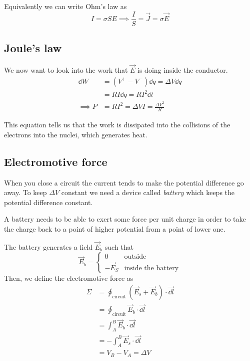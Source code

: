 \documentclass[12pt]{extarticle}
\begin{document}
Equivalently we can write Ohm's law as
\begin{equation}
    I = \sigma S E \implies \frac{I}{S} = \vec J = \sigma \vec E
\end{equation}

\subsection{Joule's law}

We now want to look into the work that $\vec E$ is doing inside the conductor.
\begin{align}
    \dd W      & = (V^+ - V^-) \dd q = \Delta V \dd q          \\
               & = R I \dd q = R I^2 \dd t                     \\
    \implies P & = R I ^ 2 = \Delta V I = \frac{\Delta V^2}{R}
\end{align}

This equation tells us that the work is dissipated into the collisions of the electrons into the nuclei,
which generates heat.

\subsection{Electromotive force}

When you close a circuit the current tends to make the potential difference go away.
To keep $\Delta V$ constant we need a device called \emph{battery} which keeps the potential difference constant.

A battery needs to be able to exert some force per unit charge in order to
take the charge back to a point of higher potential from a point of lower one.

\begin{figure}[H]
    \centering
    
\end{figure}

The battery generates a field $\vec E_b$ such that
\begin{equation}
    \vec E_b = \begin{cases}
        0         & \text{outside}            \\
        -\vec E_S & \text{inside the battery}
    \end{cases}
\end{equation}
Then, we define the electromotive force as
\begin{align}
    \Sigma & = \oint_\text{circuit} (\vec E_s + \vec E_b) \cdot \vec{\dd l} \\
           & = \oint_\text{circuit} \vec E_b \cdot \vec{\dd l}              \\
           & = \int_{A}^{B} \vec E_b \cdot \vec{\dd l }                     \\
           & = - \int_A^B \vec E_s \cdot \vec{\dd l}                        \\
           & = V_B - V_A = \Delta V
\end{align}
\end{document}
